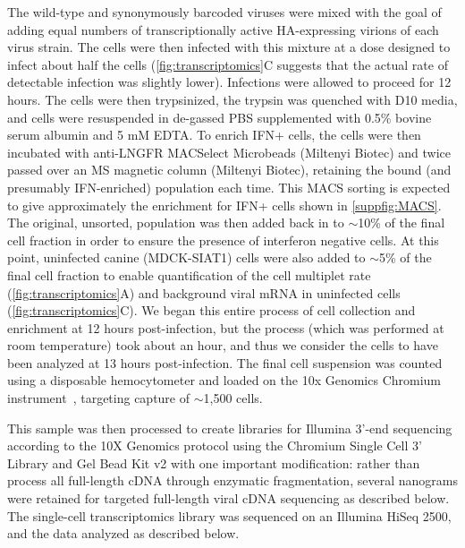 \documentclass[10pt,letterpaper]{article}
\newcommand{\FIG}[1]{\autoref{fig:#1}}
\newcommand{\SUPPFIG}[1]{\autoref{suppfig:#1}}
\begin{document}
The wild-type and synonymously barcoded viruses were mixed with the goal of adding equal numbers of transcriptionally active HA-expressing virions of each virus strain.
The cells were then infected with this mixture at a dose designed to infect about half the cells (\FIG{transcriptomics}C suggests that the actual rate of detectable infection was slightly lower).
Infections were allowed to proceed for 12 hours.
The cells were then trypsinized, the trypsin was quenched with D10 media, and cells were resuspended in de-gassed PBS supplemented with 0.5\% bovine serum albumin and 5 mM EDTA. 
To enrich IFN+ cells, the cells were then incubated with anti-LNGFR MACSelect Microbeads (Miltenyi Biotec) and twice passed over an MS magnetic column (Miltenyi Biotec), retaining the bound (and presumably IFN-enriched) population each time. 
This MACS sorting is expected to give approximately the enrichment for IFN+ cells shown in \SUPPFIG{MACS}.
The original, unsorted, population was then added back in to $\sim$10\% of the final cell fraction in order to ensure the presence of interferon negative cells. 
At this point, uninfected canine (MDCK-SIAT1) cells were also added to $\sim$5\% of the final cell fraction to enable quantification of the cell multiplet rate (\FIG{transcriptomics}A) and background viral mRNA in uninfected cells (\FIG{transcriptomics}C). 
We began this entire process of cell collection and enrichment at 12 hours post-infection, but the process (which was performed at room temperature) took about an hour, and thus we consider the cells to have been analyzed at 13 hours post-infection.
The final cell suspension was counted using a disposable hemocytometer and loaded on the 10x Genomics Chromium instrument~\cite{zheng2017massively}, targeting capture of $\sim$1,500 cells. 

This sample was then processed to create libraries for Illumina 3'-end sequencing according to the 10X Genomics protocol using the Chromium Single Cell 3' Library and Gel Bead Kit v2 with one important modification: rather than process all full-length cDNA through enzymatic fragmentation, several nanograms were retained for targeted full-length viral cDNA sequencing as described below.
The single-cell transcriptomics library was sequenced on an Illumina HiSeq 2500, and the data analyzed as described below.
\end{document}
